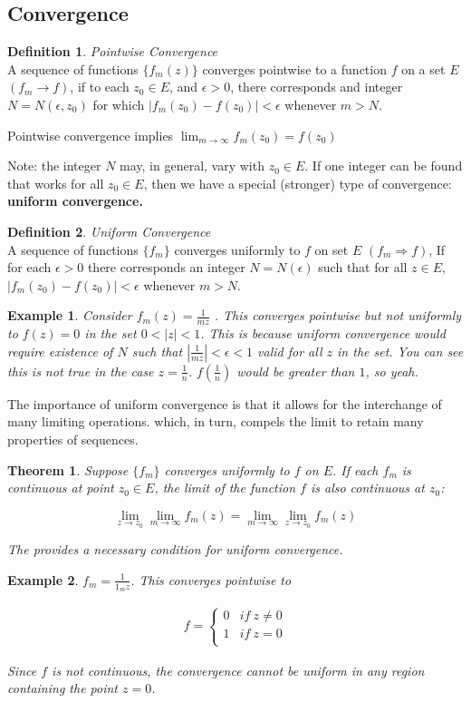 \documentclass{article}
\newtheorem{theorem}{Theorem}[section]
\newtheorem{ex}{Example}
\theoremstyle{definition}
\newtheorem{definition}{Definition}[section]
\newcommand{\Def}[2]{
\begin{shaded*}
\begin{definition}{\textit{#1}}\\#2\end{definition}
\end{shaded*}
}
\begin{document}
\subsection{Convergence}
\Def{Pointwise Convergence}{A sequence of functions $\{f_m(z)\}$ converges pointwise to a function $f$ on a set $E$ $(f_m \to f)$, if to each $z_0 \in E$, and $\epsilon>0$, there corresponds  and integer $N = N(\epsilon, z_0)$ for which $|f_m(z_0) - f(z_0)|<\epsilon$ whenever $m>N$.

Pointwise convergence implies $\lim_{m\to\infty} f_m(z_0) = f(z_0)$


Note: the integer $N$ may, in general, vary with $z_0 \in E$. If one integer can be found that works for all $z_0 \in E$, then we have a special (stronger) type of convergence: \textbf{uniform convergence.}
}

\Def{Uniform Convergence}{A sequence of functions $\{f_m\}$ converges uniformly to $f$ on set $E$ $(f_m \Rightarrow f)$, If for each $\epsilon>0$ there corresponds an integer $N = N(\epsilon)$ such that for all $z \in E$, $|f_m(z_0) - f(z_0)| < \epsilon$ whenever $m>N$.}

\begin{ex}
Consider $f_m(z) = \frac{1}{mz}$ . This converges pointwise but not uniformly to $f(z)=0$ in the set $0<|z|<1$. This is because uniform convergence would require existence of $N$ such that $\left|\frac{1}{mz}\right| < \epsilon < 1$ valid for all $z$ in the set. You can see this is not true in the case $z = \frac{1}{n}$. $f(\frac{1}{n})$ would be greater than $1$, so yeah. 
\end{ex}

The importance of uniform convergence is that it allows for the interchange of many limiting operations.  which, in turn, compels the limit to retain many properties of sequences.

\begin{theorem}
Suppose $\{f_m\}$ converges uniformly to $f$ on $E$. If each $f_m$ is continuous at point $z_0 \in E$, the limit of the function $f$ is also continuous at $z_0$:

$$\lim_{z \to z_0} \lim_{m \to \infty }f_m(z) = \lim_{m \to \infty }\lim_{z \to z_0}f_m(z)$$


The provides a necessary condition for uniform convergence.
\end{theorem}

\begin{ex}
$f_m = \frac{1}{1_mz}$. This converges pointwise to 

\begin{align}
f = \begin{cases}
0 & if\ z\neq 0 \\ 1 & if\ z = 0 \\ 
\end{cases}
\end{align}

Since $f$ is not continuous, the convergence cannot be uniform in any region containing the point $z=0$. 
\end{ex}
\end{document}
